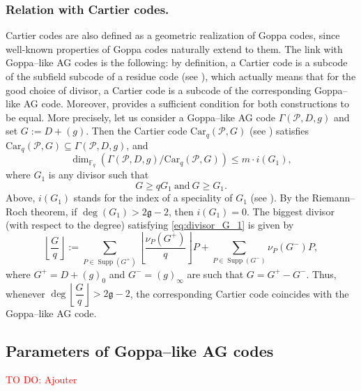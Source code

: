 \documentclass[a4paper]{article}
\theoremstyle{definition}
\theoremstyle{remark}
\newcommand{\calP}{\mathcal{P}}
\newcommand{\fq}{\mathbb{F}_{q}}
\newcommand{\Supp}{\operatorname{Supp}}
\newcommand\TODO[1]{\textcolor{red}{TO DO: #1}}
\begin{document}
\subsubsection{Relation with Cartier codes.} Cartier codes \cite{Cou14} are also defined as a geometric realization of Goppa codes, since well-known properties of Goppa codes naturally extend to them.
The link with Goppa--like AG codes is the following: by definition, a Cartier code is a subcode of the subfield subcode of a residue code (see \cite[Proposition 4.3]{Cou14}), which actually means that for the good choice of divisor, a Cartier code is a subcode of the corresponding Goppa--like AG code. Moreover, \cite[Theorem 5.1]{Cou14} provides a sufficient condition for both constructions to be equal. More precisely, let us consider a Goppa--like AG code $\Gamma(\calP,D,g)$  and set $G := D+(g)$. Then the Cartier code $\mathrm{Car}_q(\calP,G)$ (see \cite[Definition 4.2]{Cou14}) satisfies $\mathrm{Car}_q(\calP,G) \subseteq \Gamma(\calP,D,g)$, and 
$$ \dim_{\fq} \left( \Gamma(\calP,D,g)/ \mathrm{Car}_q(\calP,G)\right) \leq m \cdot i(G_1),$$
where $G_1$ is any divisor such that 
\begin{equation} \label{eq:divisor_G_1}
G \geq qG_1 \ \mathrm{and} \ G \geq G_1.
\end{equation}
 Above, $i(G_1)$ stands for the index of a speciality of $G_1$ (see \cite[Definition~1.6.10]{Sti09}). By the Riemann--Roch theorem, if $\deg(G_1) > 2\mathfrak{g}-2$, then $i(G_1) =0.$ The biggest divisor (with respect to the degree) satisfying \eqref{eq:divisor_G_1} is given by 
\begin{equation}\label{eq:G/q}
\left\lfloor \frac{G}{q} \right\rfloor := \sum\limits_{P \in \Supp(G^+)} \left\lfloor\frac{\nu_P(G^+)}{q}\right\rfloor P + \sum\limits_{P \in \Supp(G^-)}\nu_P(G^-)P,
\end{equation}
 where $G^+ = D+(g)_0$ and $G^-=(g)_\infty$ are such that $G=G^+-G^-$.
Thus, whenever $\deg\left\lfloor \dfrac{G}{q} \right\rfloor > 2\mathfrak{g}-2$, the corresponding Cartier code coincides with the Goppa--like AG code. 

\subsection{Parameters of Goppa--like AG codes} 

\TODO{Ajouter {\cite[Theorem~9.1.6]{Sti09}} }
\end{document}
